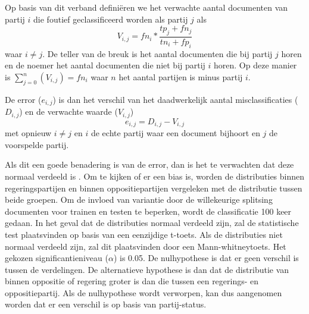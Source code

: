 Op basis van dit verband definiëren we het verwachte aantal documenten van partij $i$ die foutief geclassificeerd worden als partij $j$ als
\begin{equation}
\label{eq:expected}
V_{i,j}  = fn_i *  \frac{tp_{j}+fn_{j}}{tn_{i}+fp_{i}}
\end{equation}
waar $i\neq j$. De teller van de breuk is het aantal documenten die bij partij $j$ horen en de noemer het aantal documenten die niet bij partij $i$ horen. Op deze manier is $\sum_{j=0}^{n} (V_{i,j}) = fn_i$ waar $n$ het aantal partijen is minus partij $i$.\par
De error ($e_{i,j}$) is dan het verschil van  het daadwerkelijk aantal misclassificaties ($D_{i,j}$) en de verwachte waarde ($V_{i,j}$)
\begin{equation}
\label{eq:error}
e_{i,j} = D_{i,j} - V_{i,j}
\end{equation}
met opnieuw $i\neq j$ en $i$ de echte partij waar een document bijhoort en $j$ de voorspelde partij. \par
Als dit een goede benadering is van de error, dan is het te verwachten dat deze normaal verdeeld is \cite{citeulike:7531484}. Om te kijken of er een bias is, worden de distributies binnen regeringspartijen en binnen oppositiepartijen vergeleken met de distributie tussen beide groepen. Om de invloed van variantie door de willekeurige splitsing documenten voor trainen en testen te beperken, wordt de classificatie 100 keer gedaan. In het geval dat de distributies normaal verdeeld zijn, zal de statistische test plaatsvinden op basis van een eenzijdige t-toets. Als de distributies niet normaal verdeeld zijn, zal dit plaatsvinden door een Mann-whitneytoets. Het gekozen significantieniveau ($\alpha$) is 0.05. De nulhypothese is dat er geen verschil is tussen de verdelingen. De alternatieve hypothese is dan dat de distributie van binnen oppositie of regering groter is dan die tussen een regerings- en oppositiepartij. Als de nulhypothese wordt verworpen, kan dus aangenomen worden dat er een verschil is op basis van partij-status.\par

